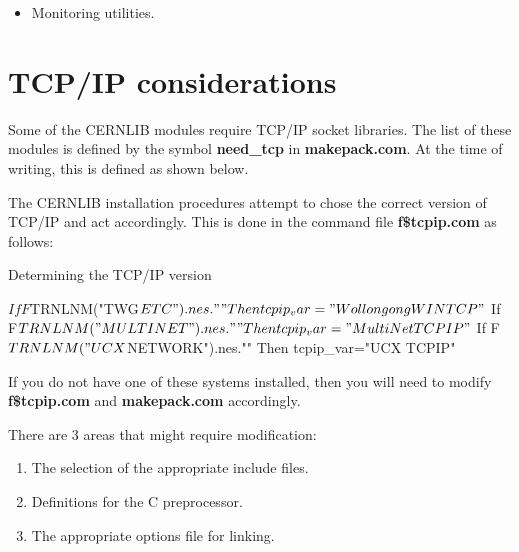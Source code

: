 \begin{itemize}
\item
Monitoring utilities. 

\end{itemize}

\section{TCP/IP considerations}

Some of the CERNLIB modules require TCP/IP socket libraries. The list
of these modules is defined by the symbol {\bf need\_tcp} in 
{\bf makepack.com}. At the time of writing, this is defined as shown below.


The CERNLIB installation procedures attempt to chose the correct version
of TCP/IP and act accordingly. This is done in the command file {\bf f\$tcpip.com}
as follows:

\begin{XMPt}{Determining the TCP/IP version}

$ If F$TRNLNM("TWG$ETC").nes.""     Then tcpip_var="Wollongong WINTCP"
$ If F$TRNLNM("MULTINET").nes.""    Then tcpip_var="MultiNet TCPIP"
$ If F$TRNLNM("UCX$NETWORK").nes."" Then tcpip_var="UCX TCPIP"

\end{XMPt}

If you do not have one of these systems installed, then you will need to
modify {\bf f\$tcpip.com} and {\bf makepack.com} accordingly.

There are 3 areas that might require modification:

\begin{enumerate}
\item
The selection of the appropriate include files.
\item
Definitions for the C preprocessor.
\item
The appropriate options file for linking.
\end{enumerate}

